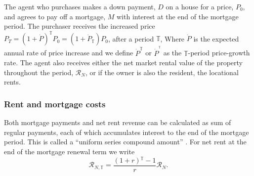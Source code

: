 The agent who purchases makes a down payment, $D$ on a house for a price, $P_0$, and agrees to pay off a mortgage, $M$ with interest at the end of the mortgage period.  The purchaser  receives the increased price 
$P_T = (1 + \dot P)^\mathbb{T}P_0 =(1+\dot P_\mathbb{T})P_0 $, 
after a period $\mathbb{T}$, Where $\dot P$  is the expected annual rate of price increase and we define $\dot P^\mathbb{T}$
or $\dot P^{^\mathbb{T}}$ 
as the $\mathbb{T}$-period  price-growth rate. The agent also receives either the net market rental value of the property throughout the period, $\mathcal{R}_N$, or if the owner is also the resident, the locational rents. 
 









 
\subsubsection{Rent and mortgage costs}
Both mortgage payments and net rent revenue can be calculated as sum of regular payments, each of which accumulates interest to the end of the mortgage period. This is called a ``uniform series compound amount'' \cite{sullivanEngineeringEconomy2003}. For net rent at the end of the mortgage renewal term we write
\begin{equation}
\mathcal{R}_{N, \mathbb{T}}= \frac{(1+r)\mathbb{^\mathbb{T}}-1}{r}\mathcal{R}_N.     
\end{equation}


